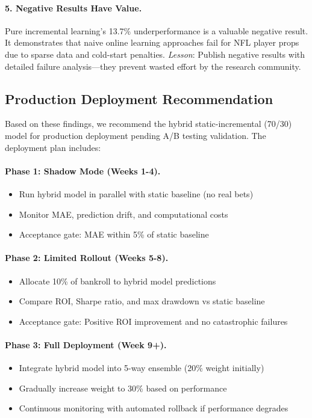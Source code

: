 \paragraph{5. Negative Results Have Value.} Pure incremental learning's 13.7\% underperformance is a valuable negative result. It demonstrates that naive online learning approaches fail for NFL player props due to sparse data and cold-start penalties. \textit{Lesson}: Publish negative results with detailed failure analysis—they prevent wasted effort by the research community.

\subsection{Production Deployment Recommendation}

Based on these findings, we recommend the hybrid static-incremental (70/30) model for production deployment pending A/B testing validation. The deployment plan includes:

\paragraph{Phase 1: Shadow Mode (Weeks 1-4).}
\begin{itemize}
\item Run hybrid model in parallel with static baseline (no real bets)
\item Monitor MAE, prediction drift, and computational costs
\item Acceptance gate: MAE within 5\% of static baseline
\end{itemize}

\paragraph{Phase 2: Limited Rollout (Weeks 5-8).}
\begin{itemize}
\item Allocate 10\% of bankroll to hybrid model predictions
\item Compare ROI, Sharpe ratio, and max drawdown vs static baseline
\item Acceptance gate: Positive ROI improvement and no catastrophic failures
\end{itemize}

\paragraph{Phase 3: Full Deployment (Week 9+).}
\begin{itemize}
\item Integrate hybrid model into 5-way ensemble (20\% weight initially)
\item Gradually increase weight to 30\% based on performance
\item Continuous monitoring with automated rollback if performance degrades
\end{itemize}

